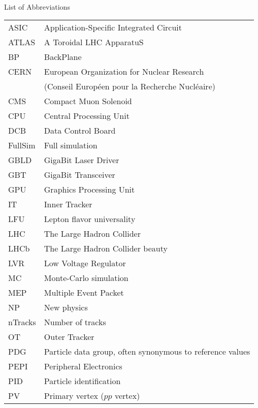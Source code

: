 \singlespacing \normalsize
\hbox{\ }

\vspace{.5in}

\begin{center}
\large{List of Abbreviations}
\end{center}

\vspace{3pt}

\begin{supertabular}{ll}
    ASIC    & Application-Specific Integrated Circuit \\
    ATLAS   & A Toroidal LHC ApparatuS \\
    BP      & BackPlane \\
    CERN    & European Organization for Nuclear Research \\
            & (Conseil Européen pour la Recherche Nucléaire) \\
    CMS     & Compact Muon Solenoid \\
    CPU     & Central Processing Unit \\
    DCB     & Data Control Board \\
    FullSim & Full simulation \\
    GBLD    & GigaBit Laser Driver \\
    GBT     & GigaBit Transceiver \\
    GPU     & Graphics Processing Unit \\
    IT      & Inner Tracker \\
    LFU     & Lepton flavor universality \\
    LHC     & The Large Hadron Collider \\
    LHCb    & The Large Hadron Collider beauty \\
    LVR     & Low Voltage Regulator \\
    MC      & Monte-Carlo simulation \\
    MEP     & Multiple Event Packet \\
    NP      & New physics \\
    nTracks & Number of tracks \\
    OT      & Outer Tracker \\
    PDG     & Particle data group, often synonymous to reference values \\
    PEPI    & Peripheral Electronics \\
    PID     & Particle identification \\
    PV      & Primary vertex ($pp$ vertex) \\

\end{supertabular}
